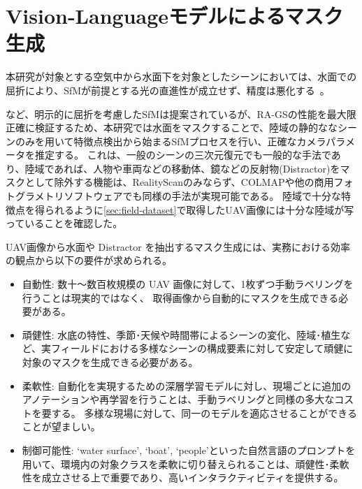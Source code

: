 
\section{Vision-Languageモデルによるマスク生成}\label{sec:mask-generation}

本研究が対象とする空気中から水面下を対象としたシーンにおいては、水面での屈折により、SfMが前提とする光の直進性が成立せず、精度は悪化する~\cite{she2024IROS_Refractive-COLMAP}。

\cite{Chadebecq2017ICCV_Refractive-Structure-from-Motion,Sedlazeck2013ICCV_Refractive-Structure-from-Motion,Makris2024_refractive-aware-sfm}
など、明示的に屈折を考慮したSfMは提案されているが、RA-GSの性能を最大限正確に検証するため、本研究では水面をマスクすることで、陸域の静的ななシーンのみを用いて特徴点検出から始まるSfMプロセスを行い、正確なカメラパラメータを推定する。
これは、一般のシーンの三次元復元でも一般的な手法であり、陸域であれば、人物や車両などの移動体、鏡などの反射物(Distractor)をマスクとして除外する機能は、RealityScanのみならず、COLMAPや他の商用フォトグラメトリソフトウェアでも同様の手法が実現可能である。
陸域で十分な特徴点を得られるように\cref{sec:field-dataset}で取得したUAV画像には十分な陸域が写っていることを確認した。


UAV画像から水面や Distractor を抽出するマスク生成には、実務における効率の観点から以下の要件が求められる。

\begin{itemize}
  \item 自動性:
    数十〜数百枚規模の UAV 画像に対して、1枚ずつ手動ラベリングを行うことは現実的ではなく、
    取得画像から自動的にマスクを生成できる必要がある。
  \item 頑健性:
    水底の特性、季節･天候や時間帯によるシーンの変化、陸域･植生など、実フィールドにおける多様なシーンの構成要素に対して安定して頑健に対象のマスクを生成できる必要がある。
  \item 柔軟性:
    自動化を実現するための深層学習モデルに対し、現場ごとに追加のアノテーションや再学習を行うことは、手動ラベリングと同様の多大なコストを要する。
    多様な現場に対して、同一のモデルを適応させることができることが望ましい。
  \item 制御可能性:
    `water surface', `boat', `people'といった自然言語のプロンプトを用いて、環境内の対象クラスを柔軟に切り替えられることは、頑健性･柔軟性を成立させる上で重要であり、高いインタラクティビティを提供する。
\end{itemize}

